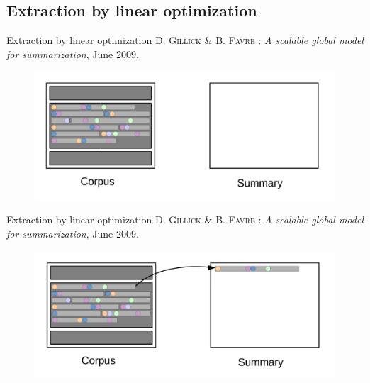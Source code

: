 \documentclass[xcolor=x11names,compress]{beamer}
\renewcommand{\(}{\begin{columns}}
\renewcommand{\)}{\end{columns}}
\newcommand{\<}[1]{\begin{column}{#1}}
\renewcommand{\>}{\end{column}}
\begin{document}
\subsection{Extraction by linear optimization}
\begin{frame}{Extraction by linear optimization}
\textsc{D. Gillick} \& \textsc{B. Favre} : \textit{A scalable global model for summarization}, June 2009.\\
\vspace{1cm}
	\begin{figure}[!h]
    	\includegraphics[scale=0.25]{1.png}
    \end{figure}
\end{frame}


\begin{frame}{Extraction by linear optimization}
\textsc{D. Gillick} \& \textsc{B. Favre} : \textit{A scalable global model for summarization}, June 2009.\\
\vspace{1cm}
	\begin{figure}[!h]
    	\includegraphics[scale=0.25]{2.png}
    \end{figure}
\end{frame}

\end{document}
